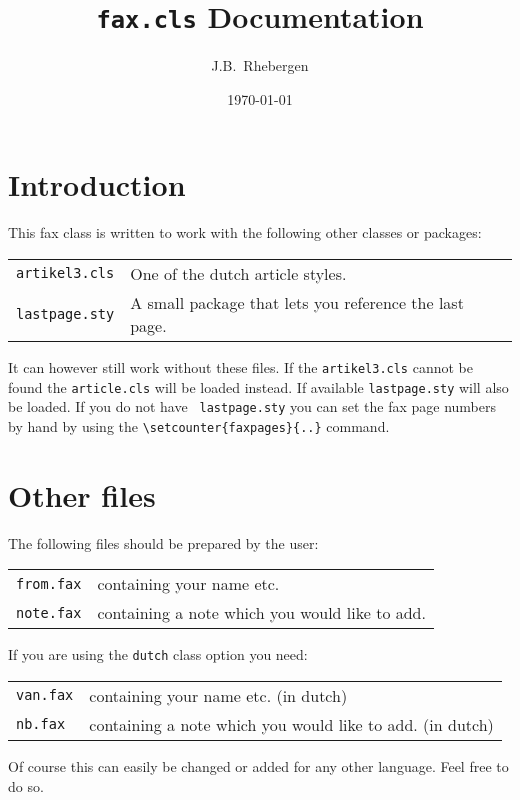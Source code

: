 \documentclass[oldtoc,a4paper,10pt]{artikel3}
\begin{document}
\author{J.B.~Rhebergen}
\date{\today}
\title{{\tt fax.cls} Documentation}
\maketitle

\section{Introduction}
This fax class is written to work with the following other classes or
packages:

\begin{tabular}{ll}
{\tt artikel3.cls} &One of the dutch article styles.\\
{\tt lastpage.sty} &A small package that lets you reference the last
page.\\
\end{tabular}

It can however still work without these files. If the {\tt artikel3.cls}
cannot be found the {\tt article.cls} will be loaded instead. If available
{\tt lastpage.sty} will also be loaded. If you do not have {\tt
lastpage.sty} you can set the fax page numbers by hand by using the
\verb|\setcounter{faxpages}{..}| command.

\section{Other files}
The following files should be prepared by the user:

\begin{tabular}{ll}
{\tt from.fax} &containing your name etc.\\
{\tt note.fax} &containing a note which you would like to add.\\
\end{tabular}

If you are using the {\tt dutch} class option you need:

\begin{tabular}{ll}
{\tt van.fax} &containing your name etc. (in dutch)\\
{\tt nb.fax}  &containing a note which you would like to add. (in dutch)\\
\end{tabular}

Of course this can easily be changed or added for any other language. Feel
free to do so.
\end{document}
